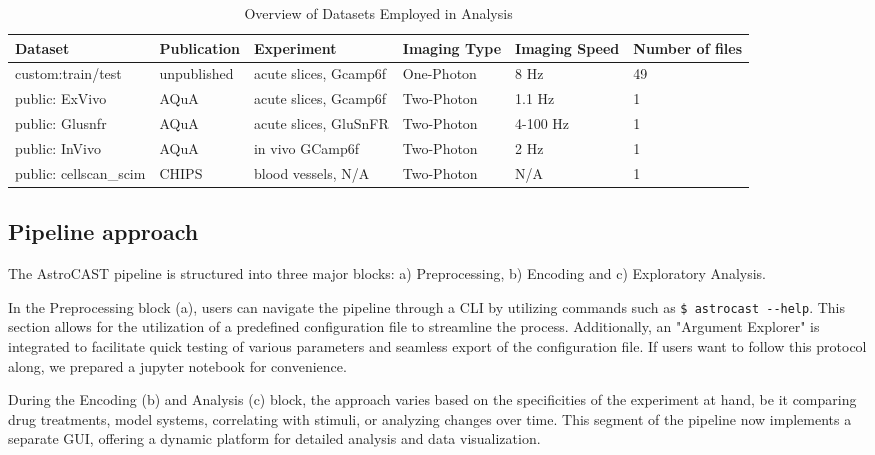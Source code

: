 \begin{table}[ht]
    \centering
    \caption{Overview of Datasets Employed in Analysis}
    \begin{tabular}{|l|l|l|l|l|l|}
        \hline
        \textbf{Dataset}       & \textbf{Publication} & \textbf{Experiment}   & \textbf{Imaging Type} & \textbf{
            Imaging Speed} & \textbf{Number of files} \\ \hline
        custom:train/test      & unpublished          & acute slices, Gcamp6f & One-Photon            & 8 Hz
        & 49                       \\ \hline
        public: ExVivo         & AQuA                 & acute slices, Gcamp6f & Two-Photon            & 1.1 Hz
        & 1                        \\ \hline
        public: Glusnfr        & AQuA                 & acute slices, GluSnFR & Two-Photon            & 4-100 Hz
        & 1                        \\ \hline
        public: InVivo         & AQuA                 & in vivo GCamp6f       & Two-Photon            & 2 Hz
        & 1                        \\ \hline
        public: cellscan\_scim & CHIPS                & blood vessels, N/A    & Two-Photon            & N/A
        & 1                        \\ \hline
    \end{tabular}
\end{table}

\subsection{Pipeline approach}
The AstroCAST pipeline is structured into three major blocks: a) Preprocessing, b) Encoding and c) Exploratory Analysis.

In the Preprocessing block (a), users can navigate the pipeline through a \ac{CLI} by utilizing commands such as \lstinline[style=bashStyle]{$ astrocast --help}. This section allows for the utilization of a predefined configuration file to streamline the process. Additionally, an "Argument Explorer" is integrated to facilitate quick testing of various parameters and seamless export of the configuration file. If users want to follow this protocol along, we prepared a jupyter notebook for convenience.

During the Encoding (b) and Analysis (c) block, the approach varies based on the specificities of the experiment at
hand, be it comparing drug treatments, model systems, correlating with stimuli, or analyzing changes over time. This
segment of the pipeline now implements a separate GUI, offering a dynamic platform for detailed analysis and data
visualization.
